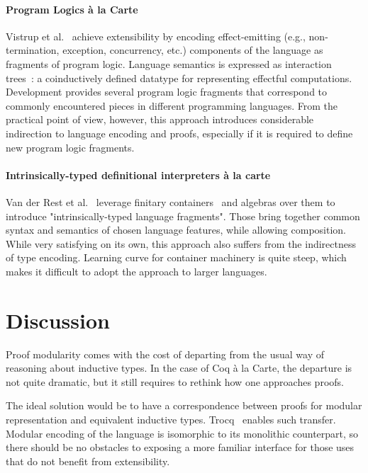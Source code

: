 \documentclass[sigplan,nonacm,review]{acmart}
\begin{document}
\paragraph{Program Logics à la Carte}
Vistrup et al.~\cite{vistrup2025program} achieve extensibility by encoding effect-emitting
(e.g., non-termination, exception, concurrency, etc.)
components of the language as fragments of program logic. 
Language semantics is expressed as interaction trees~\cite{xia2019interaction}: a coinductively defined datatype for representing effectful computations. 
Development provides several program logic fragments that correspond to commonly encountered pieces in different programming languages. 
%
%
%
%
From the practical point of view, however, this approach introduces considerable indirection to language encoding and proofs, especially if it is required to define new program logic fragments.

\paragraph{Intrinsically-typed definitional interpreters {\`a} la carte}
Van der Rest et al.~\cite{van2022intrinsically} leverage finitary containers~\cite{altenkirch2015indexed} and algebras over them to introduce "intrinsically-typed language fragments".
Those bring together common syntax and semantics of chosen language features, while allowing composition. 
%
%
%
%
While very satisfying on its own, this approach also suffers from the indirectness of type encoding. Learning curve for container machinery is quite steep, which makes it difficult to adopt the approach to larger languages.


\section{Discussion}

Proof modularity comes with the cost of departing from the usual way of reasoning about inductive types. 
In the case of Coq à la Carte, the departure is not quite dramatic, but it still requires to rethink how one approaches proofs.

The ideal solution would be to have a correspondence between proofs for modular representation and equivalent inductive types. Trocq~\cite{cohen2024trocq} enables such transfer. Modular encoding of the language is isomorphic to its monolithic counterpart, so there should be no obstacles to exposing a more familiar interface for those uses that do not benefit from extensibility.
\end{document}
